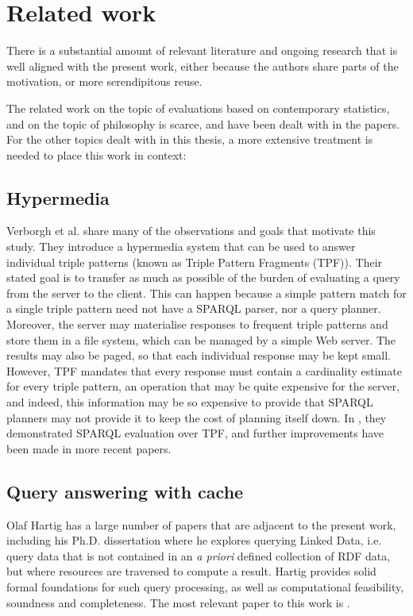 \section{Related work}\label{sec:related}

There is a substantial amount of relevant literature and ongoing
research that is well aligned with the present work, either because
the authors share parts of the motivation, or more serendipitous
reuse.

The related work on the topic of evaluations based on contemporary
statistics, and on the topic of philosophy is scarce, and have been
dealt with in the papers. For the other topics dealt with in this
thesis, a more extensive treatment is needed to place this work in
context:

\subsection{Hypermedia}

Verborgh et al. \cite{ldf1} share many of the observations and goals
that motivate this study. They introduce a hypermedia system that can
be used to answer individual triple patterns (known as Triple Pattern
Fragments (TPF)). Their stated goal is to transfer as much as possible
of the burden of evaluating a query from the server to the
client. This can happen because a simple pattern match for a single
triple pattern need not have a SPARQL parser, nor a query
planner. Moreover, the server may materialise responses to frequent
triple patterns and store them in a file system, which can be managed
by a simple Web server. The results may also be paged, so that each
individual response may be kept small. However, TPF mandates that
every response must contain a cardinality estimate for every triple
pattern, an operation that may be quite expensive for the server, and
indeed, this information may be so expensive to provide that SPARQL
planners may not provide it to keep the cost of planning itself
down. In \cite{verborgh2014querying}, they demonstrated SPARQL evaluation over TPF,
and further improvements have been made in more recent papers.

\subsection{Query answering with cache}


Olaf Hartig has a large number of papers that are adjacent to the
present work, including his Ph.D. dissertation \cite{hartig2014querying} where he
explores querying Linked Data, i.e. query data that is not contained
in an \textit{a priori} defined collection of RDF data, but where resources
are traversed to compute a result. Hartig provides solid formal
foundations for such query processing, as well as computational
feasibility, soundness and completeness. The most relevant paper to
this work is \cite{hartig2011caching}.

